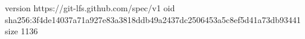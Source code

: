 version https://git-lfs.github.com/spec/v1
oid sha256:3f4de14037a71a927e83a3818ddb49a2437dc2506453a5c8ef5d41a73db93441
size 1136
